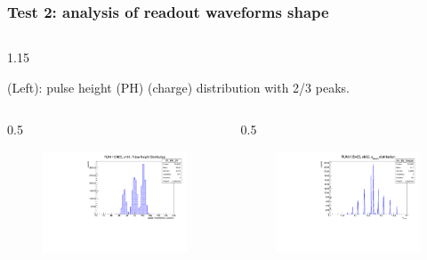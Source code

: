 \documentclass{beamer}
\begin{document}
\begin{frame}
    \frametitle{Test 2: analysis of readout waveforms shape}
    \vspace{-4mm}
    \begin{columns}
\begin{column}{1.15\framewidth}
    \setlength{\leftmargini}{1.2em}
 \begin{itemize}
{\small \item (Left): pulse height (PH) (charge) distribution with 2/3 peaks.}
  \end{itemize}
    \end{column}
    \end{columns}
        \vspace{-3mm}
    \begin{columns}
\begin{column}{0.5\framewidth}
         \begin{figure}[!h]
      \centering
      \hspace*{-2em}
      \includegraphics[width=0.9\columnwidth]{figures/pdf/pulseheight.pdf}
     \label{fig:normalhits}
\end{figure}
\end{column}
\begin{column}{0.5\framewidth}
      \begin{figure}[!h]
      \centering
            \hspace*{-1em}
\includegraphics[width=0.9\columnwidth]{figures/pdf/tmean1.pdf}

\end{figure}
\end{column}
\end{columns}
\end{frame}
\end{document}

